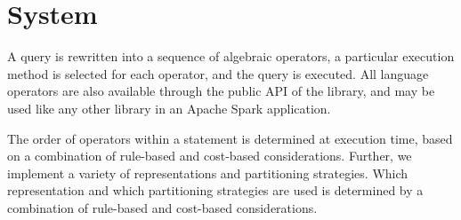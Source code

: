 \section{System}
\label{sec:sys}

A \ql query is rewritten into a sequence of algebraic operators, a
particular execution method is selected for each operator, and the
query is executed.  All language operators are also available through
the public API of the \ql library, and may be used like any other
library in an Apache Spark application.

The order of operators within a \ql statement is determined at
execution time, based on a combination of rule-based and cost-based
considerations.  Further, we implement a variety of \tg
representations and partitioning strategies.  Which representation and
which partitioning strategies are used is determined by a combination
of rule-based and cost-based considerations.

